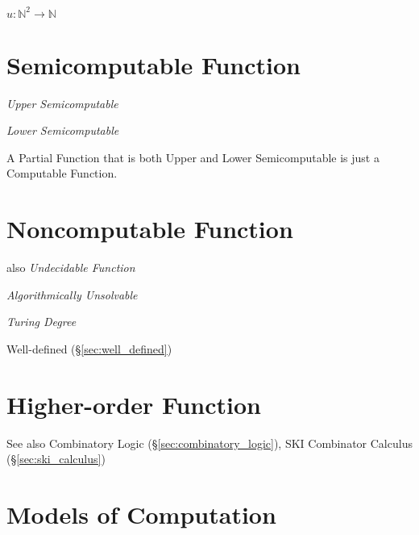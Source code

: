 $u : \mathbb{N}^2 \rightarrow \mathbb{N}$



\section{Semicomputable Function}\label{sec:semicomputable_function}

\emph{Upper Semicomputable}

\emph{Lower Semicomputable}

A Partial Function that is both Upper and Lower Semicomputable is just
a Computable Function.



\section{Noncomputable Function}\label{sec:noncomputable_function}

also \emph{Undecidable Function}

\emph{Algorithmically Unsolvable}

\emph{Turing Degree}

Well-defined (\S\ref{sec:well_defined})



\section{Higher-order Function}\label{sec:higherorder_function}

\fist See also Combinatory Logic (\S\ref{sec:combinatory_logic}), SKI
Combinator Calculus (\S\ref{sec:ski_calculus})



\section{Models of Computation}\label{sec:computation_model}

